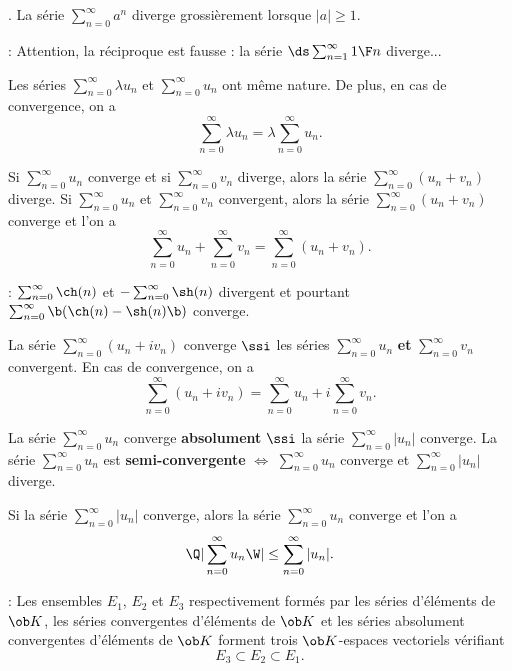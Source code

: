 \Exemple. La série $\sum_{n=0}^\infty a^n$ diverge grossièrement lorsque $|a|\ge1$. 
\bigskip

\Remarque : Attention, la réciproque est fausse : la série $\ds\sum_{n=1}^\infty{1\F n}$ diverge... 
\bigskip



Les séries $\sum_{n=0}^\infty \lambda u_n$ et $\sum_{n=0}^\infty u_n$ ont même nature. 
De plus, en cas de convergence, on a 
\Equation [\bf Multiplication]
$$
\sum_{n=0}^\infty\lambda u_n=\lambda\sum_{n=0}^\infty u_n. 
$$

Si $\sum_{n=0}^\infty u_n$ converge et si $\sum_{n=0}^\infty v_n$ diverge, 
alors la série $\sum_{n=0}^\infty(u_n+v_n)$ diverge. \medskip\noindent 
Si $\sum_{n=0}^\infty u_n$ et $\sum_{n=0}^\infty v_n$ convergent, 
alors la série $\sum_{n=0}^\infty(u_n+v_n)$ converge et l'on a 
\Equation[\bf Addition]
$$
\sum_{n=0}^\infty u_n+\sum_{n=0}^\infty v_n=\sum_{n=0}^\infty(u_n+v_n).
$$ 

\Remarque : $\sum_{n=0}^\infty\ch(n)$ et $-\sum_{n=0}^\infty\sh(n)$ divergent et pourtant $\sum_{n=0}^\infty\b(\ch (n)-\sh(n)\b)$ converge. 
\bigskip

La série $\sum_{n=0}^\infty(u_n+iv_n)$ converge $\ssi$ les séries 
$\sum_{n=0}^\infty u_n$ {\bf et} $\sum_{n=0}^\infty v_n$ convergent. 
En cas de convergence, on a 
\Equation [\bf Composantes]
$$
\sum_{n=0}^\infty(u_n+i v_n)=\sum_{n=0}^\infty u_n+i\sum_{n=0}^\infty v_n. 
$$

La série $\sum_{n=0}^\infty u_n$ converge {\bf absolument} $\ssi$ 
la série $\sum_{n=0}^\infty|u_n|$ converge. \medskip\noindent
La série $\sum_{n=0}^\infty u_n$ est {\bf semi-convergente} $\Longleftrightarrow$ 
$\sum_{n=0}^\infty u_n$ converge et $\sum_{n=0}^\infty|u_n|$ diverge. 


Si la série $\sum_{n=0}^\infty|u_n|$ converge, alors la série $\sum_{n=0}^\infty u_n$ converge et l'on a 
$$
\Q|\sum_{n=0}^\infty u_n\W|\le \sum_{n=0}^\infty|u_n|. 
$$


\Remarque : Les ensembles $E_1$, $E_2$ et $E_3$ respectivement formés par les séries d'éléments de $\ob K$, 
les séries convergentes d'éléments de $\ob K$ et les séries absolument convergentes d'éléments de $\ob K$ 
forment trois $\ob K$-espaces vectoriels vérifiant 
$$
E_3\subset E_2\subset E_1.
$$ 


